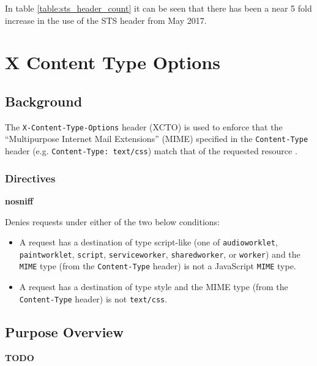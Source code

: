 \documentclass{mscreport}
\begin{document}
\vspace{0.3cm} \noindent
In table \ref{table:sts_header_count} it can be seen that there has been a near 5 fold increase in the use of the STS header from May 2017.

\clearpage
\newpage


\section{X Content Type Options}
\label{section:xcto}

\subsection{Background}

The \texttt{X-Content-Type-Options} header (XCTO) is used to enforce that the ``Multipurpose Internet Mail Extensions'' (MIME) specified in the \texttt{Content-Type} header (e.g. \newline 
\texttt{Content-Type: text/css}) match that of the requested resource \cite{Apple_undated-hz}.

\subsubsection{Directives}

\textbf{nosniff}

\vspace{0.3cm} \noindent
Denies requests under either of the two below conditions:

\begin{itemize}
  \setlength\itemsep{0.1em}
  \item A request has a destination of type script-like (one of \texttt{audioworklet}, \texttt{paintworklet}, \texttt{script}, \texttt{serviceworker}, \texttt{sharedworker}, or \texttt{worker}) and the \texttt{MIME} type (from the \texttt{Content-Type} header) is not a JavaScript \texttt{MIME} type.
  \item A request has a destination of type style and the MIME type (from the \texttt{Content-Type} header) is not \texttt{text/css}.
\end{itemize}

\subsection{Purpose Overview}

\textbf{TODO}

\newpage
\end{document}

